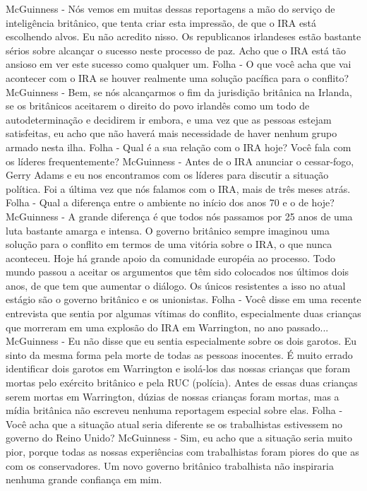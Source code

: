 McGuinness - Nós vemos em muitas dessas reportagens a mão do serviço de inteligência britânico, que tenta criar esta impressão, de que o IRA está escolhendo alvos. Eu não acredito nisso.
Os republicanos irlandeses estão bastante sérios sobre alcançar o sucesso neste processo de paz. Acho que o IRA está tão ansioso em ver este sucesso como qualquer um.
Folha - O que você acha que vai acontecer com o IRA se houver realmente uma solução pacífica para o conflito?
McGuinness - Bem, se nós alcançarmos o fim da jurisdição britânica na Irlanda, se os britânicos aceitarem o direito do povo irlandês como um todo de autodeterminação e decidirem ir embora, e uma vez que as pessoas estejam satisfeitas, eu acho que não haverá mais necessidade de haver nenhum grupo armado nesta ilha.
Folha - Qual é a sua relação com o IRA hoje? Você fala com os líderes frequentemente?
McGuinness - Antes de o IRA anunciar o cessar-fogo, Gerry Adams e eu nos encontramos com os líderes para discutir a situação política.
Foi a última vez que nós falamos com o IRA, mais de três meses atrás.
Folha - Qual a diferença entre o ambiente no início dos anos 70 e o de hoje?
McGuinness - A grande diferença é que todos nós passamos por 25 anos de uma luta bastante amarga e intensa. O governo britânico sempre imaginou uma solução para o conflito em termos de uma vitória sobre o IRA, o que nunca aconteceu.
Hoje há grande apoio da comunidade européia ao processo. Todo mundo passou a aceitar os argumentos que têm sido colocados nos últimos dois anos, de que tem que aumentar o diálogo.
Os únicos resistentes a isso no atual estágio são o governo britânico e os unionistas.
Folha - Você disse em uma recente entrevista que sentia por algumas vítimas do conflito, especialmente duas crianças que morreram em uma explosão do IRA em Warrington, no ano passado...
McGuinness - Eu não disse que eu sentia especialmente sobre os dois garotos. Eu sinto da mesma forma pela morte de todas as pessoas inocentes.
É muito errado identificar dois garotos em Warrington e isolá-los das nossas crianças que foram mortas pelo exército britânico e pela RUC (polícia).
Antes de essas duas crianças serem mortas em Warrington, dúzias de nossas crianças foram mortas, mas a mídia britânica não escreveu nenhuma reportagem especial sobre elas.
Folha - Você acha que a situação atual seria diferente se os trabalhistas estivessem no governo do Reino Unido?
McGuinness - Sim, eu acho que a situação seria muito pior, porque todas as nossas experiências com trabalhistas foram piores do que as com os conservadores. Um novo governo britânico trabalhista não inspiraria nenhuma grande confiança em mim.
